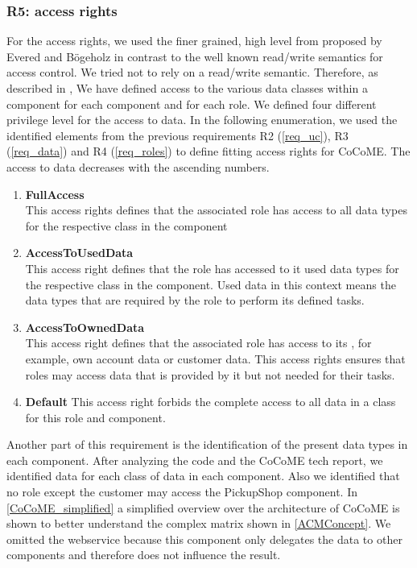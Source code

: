 \subsubsection{R5: access rights}
For the access rights, we used the finer grained, high level from proposed by Evered and Bögeholz \cite{CaseStudyAndAccessrigths} in contrast to the well known read/write semantics for access control. We tried not to rely on a read/write semantic. Therefore, as described in , We have defined access to the various data classes within a component for each component and for each role. We defined four different privilege level for the access to data. In the following enumeration, we used the identified elements from the previous requirements R2 (\autoref{req_uc}), R3 (\autoref{req_data}) and R4 (\autoref{req_roles}) to define fitting access rights for CoCoME. The access to data decreases with the ascending numbers.
\begin{enumerate}
\item \textbf{FullAccess}\\ This access rights defines that the associated role has access to all data types for the respective class in the component
\item \textbf{AccessToUsedData}\\ This access right defines that the role has accessed to it used data types for the respective class in the component. Used data in this context means the data types that are required by the role to perform its defined tasks.
\item \textbf{AccessToOwnedData}\\ This access right defines that the associated role has access to its , for example, own account data or customer data. This access rights ensures that roles may access data that is provided by it but not needed for their tasks.
\item \textbf{Default} This access right forbids the complete access to all data in a class for this role and component.
\end{enumerate}
Another part of this requirement is the identification of the present data types in each component. After analyzing the code and the CoCoME tech report, we identified data for each class of data in each component. Also we identified that no role except the customer may access the PickupShop component. In \autoref{CoCoME_simplified} a simplified overview over the architecture of CoCoME is shown to better understand the complex matrix shown in \autoref{ACMConcept}. We omitted the webservice because this component only delegates the data to other components and therefore does not influence the result.
